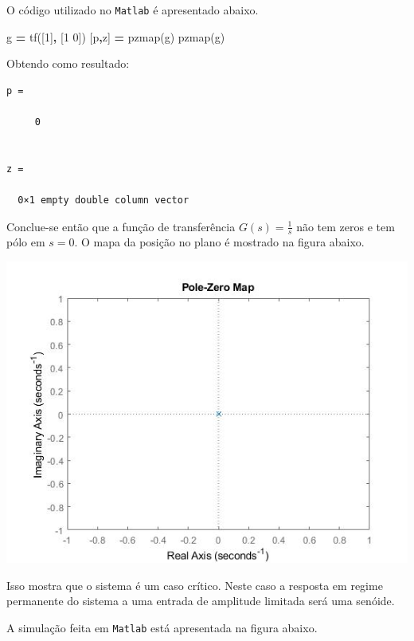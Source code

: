 \documentclass[
]{book}
\newenvironment{Shaded}{\begin{snugshade}}{\end{snugshade}}
\newcommand{\FloatTok}[1]{\textcolor[rgb]{0.00,0.00,0.81}{#1}}
\newcommand{\NormalTok}[1]{#1}
\newcommand{\OperatorTok}[1]{\textcolor[rgb]{0.81,0.36,0.00}{\textbf{#1}}}
\newcommand{\VariableTok}[1]{\textcolor[rgb]{0.00,0.00,0.00}{#1}}
\theoremstyle{definition}
\theoremstyle{definition}
\theoremstyle{definition}
\theoremstyle{remark}
\begin{document}
O código utilizado no \texttt{Matlab} é apresentado abaixo.

\begin{Shaded}
\begin{Highlighting}[]
\VariableTok{g} \OperatorTok{=} \VariableTok{tf}\NormalTok{([}\FloatTok{1}\NormalTok{]}\OperatorTok{,}\NormalTok{ [}\FloatTok{1} \FloatTok{0}\NormalTok{])}
\NormalTok{[}\VariableTok{p}\OperatorTok{,}\VariableTok{z}\NormalTok{] }\OperatorTok{=} \VariableTok{pzmap}\NormalTok{(}\VariableTok{g}\NormalTok{)}
\VariableTok{pzmap}\NormalTok{(}\VariableTok{g}\NormalTok{)}
\end{Highlighting}
\end{Shaded}

Obtendo como resultado:

\begin{verbatim}
p =

     0


z =

  0×1 empty double column vector
\end{verbatim}

Conclue-se então que a função de transferência \(G(s) = \frac {1}{s}\) não tem zeros e tem pólo em \(s = 0\). O mapa da posição no plano é mostrado na figura abaixo.

\includegraphics{Imagens/Lab2/prob2.jpg}

Isso mostra que o sistema é um caso crítico. Neste caso a resposta em regime permanente do sistema a uma entrada de amplitude limitada será uma senóide.

A simulação feita em \texttt{Matlab} está apresentada na figura abaixo.
\end{document}
